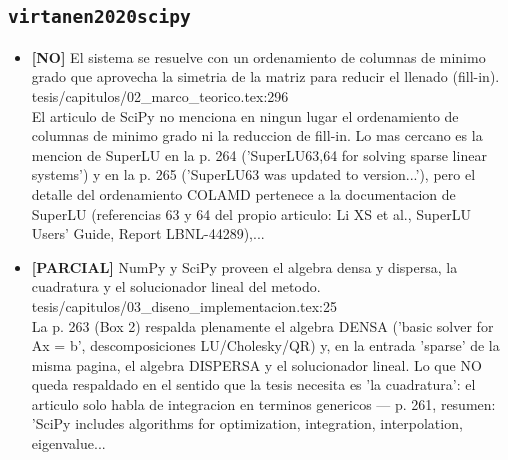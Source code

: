 \documentclass[11pt,a4paper]{article}
\newcommand{\campo}[1]{\textcolor{gris}{\footnotesize #1}}
\begin{document}
\subsection{\texttt{virtanen2020scipy}}
\begin{itemize}\small
\item \textbf{[NO]} El sistema se resuelve \textquotedbl{}con un ordenamiento de columnas de minimo grado que aprovecha la simetria de la matriz para reducir el llenado (fill-in)\textquotedbl{}. tesis/capitulos/02\_marco\_teorico.tex:296
\\ \campo{El articulo de SciPy no menciona en ningun lugar el ordenamiento de columnas de minimo grado ni la reduccion de fill-in. Lo mas cercano es la mencion de SuperLU en la p. 264 ('SuperLU63,64 for solving sparse linear systems') y en la p. 265 ('SuperLU63 was updated to version...'), pero el detalle del ordenamiento COLAMD pertenece a la documentacion de SuperLU (referencias 63 y 64 del propio articulo: Li XS et al., SuperLU Users' Guide, Report LBNL-44289),...}
\item \textbf{[PARCIAL]} NumPy y SciPy \textquotedbl{}proveen el algebra densa y dispersa, la cuadratura y el solucionador lineal del metodo\textquotedbl{}. tesis/capitulos/03\_diseno\_implementacion.tex:25
\\ \campo{La p. 263 (Box 2) respalda plenamente el algebra DENSA ('basic solver for Ax = b', descomposiciones LU/Cholesky/QR) y, en la entrada 'sparse' de la misma pagina, el algebra DISPERSA y el solucionador lineal. Lo que NO queda respaldado en el sentido que la tesis necesita es 'la cuadratura': el articulo solo habla de integracion en terminos genericos --- p. 261, resumen: 'SciPy includes algorithms for optimization, integration, interpolation, eigenvalue...}
\end{itemize}
\end{document}
